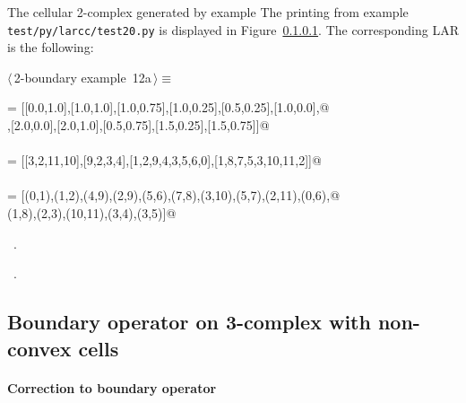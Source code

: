 \documentclass[11pt,oneside]{article}	%
\begin{document}
The cellular 2-complex generated by example \texttt{}The printing from example \texttt{test/py/larcc/test20.py} is displayed in Figure~\ref{}.
The corresponding LAR is the following:
\begin{flushleft} \small \label{scrap20}
\protect{}$\langle\,$2-boundary example\nobreak\ {\footnotesize 12a}$\,\rangle\equiv$
\vspace{-1ex}
\begin{list}{}{} \item
\mbox{}\verb@V = [[0.0,1.0],[1.0,1.0],[1.0,0.75],[1.0,0.25],[0.5,0.25],[1.0,0.0],@\\
\mbox{}\verb@[0.0,0.0],[2.0,0.0],[2.0,1.0],[0.5,0.75],[1.5,0.25],[1.5,0.75]]@\\
\mbox{}\verb@@\\
\mbox{}\verb@FV = [[3,2,11,10],[9,2,3,4],[1,2,9,4,3,5,6,0],[1,8,7,5,3,10,11,2]]@\\
\mbox{}\verb@@\\
\mbox{}\verb@EV = [(0,1),(1,2),(4,9),(2,9),(5,6),(7,8),(3,10),(5,7),(2,11),(0,6),@\\
\mbox{}\verb@(1,8),(2,3),(10,11),(3,4),(3,5)]@\\
\mbox{}\verb@@{\NWsep}
\end{list}
\vspace{-1ex}
\footnotesize\addtolength{\baselineskip}{-1ex}
\begin{list}{}{\setlength{\itemsep}{-\parsep}\setlength{\itemindent}{-\leftmargin}}
\item \NWtxtMacroDefBy\ .
\item \NWtxtMacroRefIn\ .
\end{list}
\end{flushleft}


\subsection{Boundary operator on 3-complex with non-convex cells}

\paragraph{Correction to boundary operator}
\end{document}
